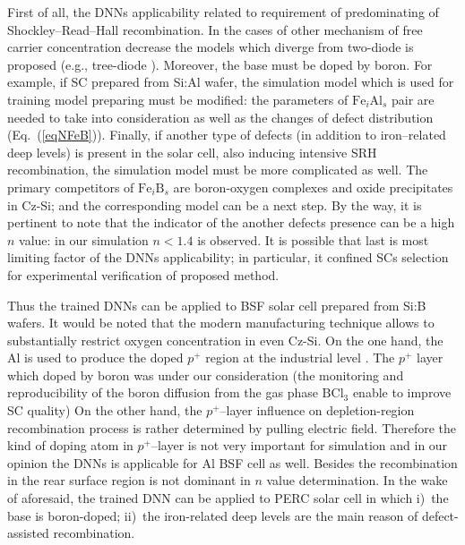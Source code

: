 \documentclass[num-refs]{wiley-article} %
\begin{document}
First of all, the DNNs applicability related to requirement of 
predominating of Shockley–Read–Hall recombination.
In the cases of other mechanism of free carrier concentration decrease the
models which diverge from two-diode is proposed (e.g., tree-diode \cite{TreeDiode,Shah}).
Moreover, the base must be doped by boron.
For example, if SC prepared from Si:Al wafer,
the simulation model which is used for training model preparing must
be modified: the parameters of $\mathrm{Fe}_i\mathrm{Al}_s$ pair are needed 
to take into consideration as well as the changes of defect 
distribution (Eq.~(\ref{eqNFeB})).
Finally, if another type of defects (in addition to iron--related deep levels)
is present in the solar cell, also inducing intensive SRH recombination,
the simulation model must be more complicated as well.
The primary competitors of $\mathrm{Fe}_i\mathrm{B}_s$  are  boron-oxygen complexes \cite{LIDRev,LIDRev2}
and oxide precipitates \cite{MurphySC2014,Oxide:Chen} in Cz-Si; 
and the corresponding model can be a next step.
By the way, it is pertinent to note that the indicator of 
the another defects presence can be a high $n$ value:
in our simulation $n<1.4$ is observed.
It is possible that last is most limiting factor of the DNNs applicability;
in particular, it confined SCs selection for experimental verification of proposed method.
 
Thus the trained DNNs can be applied to BSF solar cell prepared from Si:B wafers.
It would be noted that the modern manufacturing technique allows to substantially restrict
oxygen concentration in even Cz-Si.
On the one hand,  the Al is used to produce the doped $p^+$ region
at the industrial level \cite{GreenRew2019,WilsonRew2020}.
The $p^{+}$ layer which doped by boron was under our consideration 
(the monitoring and reproducibility of the boron diffusion from the gas phase 
$\mathrm{B}\mathrm{Cl}_3$ enable to improve SC quality)
On the other hand, the $p^+$--layer influence on depletion-region recombination
process is rather determined by pulling electric field.
Therefore the kind of doping atom in $p^+$--layer is not very important for simulation
and in our opinion the  DNNs is applicable for Al BSF cell as well.
Besides the recombination in the rear surface region is not dominant
in $n$ value determination.
In the wake of aforesaid, the trained DNN can be applied to PERC solar cell in which
i)~the base is boron-doped;
ii)~the iron-related deep levels are the main reason of defect-assisted recombination.
\end{document}
